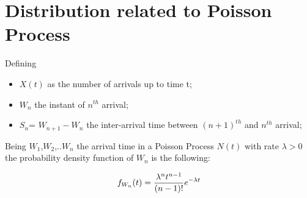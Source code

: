 \section{Distribution related to Poisson Process}
Defining
\begin{itemize}
	\item $X(t)$ as the number of arrivals up to time t;
	\item $W_n$ the instant of $n^{th}$ arrival;
	\item $S_n$= $W_{n+1} - W_n$ the inter-arrival time between $(n+1)^{th}$ and $n^{th}$ arrival; %
\end{itemize}

\begin{theorem}
	Being $W_{1}$,$W_{2}$,..$W_{n}$ the arrival time in a Poisson Process $N(t)$ with rate ${\lambda}>0$ the probability density function of $W_n$ is the following:

	\begin{equation}
	f_{W_n} (t )=\frac{\lambda^n t^{n-1}} {(n-1)!}e^{-\lambda t} \\
	\end{equation}
\end{theorem}

